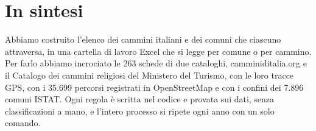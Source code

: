 
\newcommand{\ReportLang}{italian}
\newcommand{\ReportBrand}{Nomisma}
\newcommand{\ReportProject}{Cammini italiani}
\newcommand{\ReportTitle}{212 cammini italiani e i 3.411 comuni che attraversano}
\newcommand{\ReportSubtitle}{Come è costruita la cartella di lavoro, come si legge e quanto valgono i suoi numeri}
\newcommand{\ReportAuthor}{Alberto Berni}
\newcommand{\ReportRole}{Junior Data Engineer}
\newcommand{\ReportDate}{4 novembre 2026}



\newcommand{\crefpairconjunction}{ e }
\newcommand{\crefmiddleconjunction}{, }
\newcommand{\creflastconjunction}{ e }
\newcommand{\crefrangeconjunction}{ - }
\makeatletter
\renewcommand{\needspace}[1]{\par\begingroup\setlength{\dimen@}{#1}\dimen@ii\pagegoal
  \advance\dimen@ii-\pagetotal\ifdim\dimen@>\dimen@ii\ifdim\dimen@ii>\z@\vfil\fi\break\fi\endgroup}
\setlength{\@fptop}{0pt}
\setlength{\@fpsep}{14pt plus 2pt}
\setlength{\@fpbot}{0pt plus 1fil}
\makeatother



\maketitleblock

\section{In sintesi}

Abbiamo costruito l'elenco dei cammini italiani e dei comuni che ciascuno attraversa, in una cartella di lavoro Excel che si legge per comune o per cammino. Per farlo abbiamo incrociato le 263 schede di due cataloghi, camminiditalia.org e il Catalogo dei cammini religiosi del Ministero del Turismo, con le loro tracce GPS, con i 35.699 percorsi registrati in OpenStreetMap e con i confini dei 7.896 comuni ISTAT. Ogni regola è scritta nel codice e provata sui dati, senza classificazioni a mano, e l'intero processo si ripete ogni anno con un solo comando.

